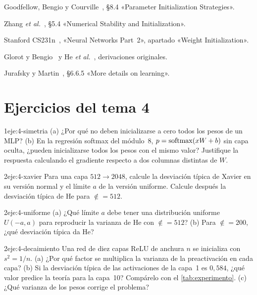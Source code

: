 \begin{lecturas}
\item Goodfellow, Bengio y Courville~\cite{gbc}, §8.4 «Parameter Initialization Strategies».
\item Zhang \emph{et al.}~\cite{d2l}, §5.4 «Numerical Stability and Initialization».
\item Stanford CS231n~\cite{cs231n}, «Neural Networks Part~2», apartado «Weight Initialization».
\item Glorot y Bengio~\cite{glorot} y He \emph{et al.}~\cite{he}, derivaciones originales.
\item Jurafsky y Martin~\cite{jm3}, §6.6.5 «More details on learning».
\end{lecturas}

\section*{Ejercicios del tema 4}

\begin{ejercicio}{1}{eje:4-simetria}
(a) ¿Por qué no deben inicializarse a cero todos los pesos de un MLP? (b) En la regresión softmax del módulo~8, $p=\operatorname{softmax}(xW+b)$ sin capa oculta, ¿pueden inicializarse todos los pesos con el mismo valor? Justifique la respuesta calculando el gradiente respecto a dos columnas distintas de $W$.
\end{ejercicio}

\begin{ejercicio}{2}{eje:4-xavier}
Para una capa $512\to 2048$, calcule la desviación típica de Xavier en su versión normal y el límite $a$ de la versión uniforme. Calcule después la desviación típica de He para $\nin=512$.
\end{ejercicio}

\begin{ejercicio}{2}{eje:4-uniforme}
(a) ¿Qué límite $a$ debe tener una distribución uniforme $U(-a,a)$ para reproducir la varianza de He con $\nin=512$? (b) Para $\nin=200$, ¿qué desviación típica da He?
\end{ejercicio}

\begin{ejercicio}{2}{eje:4-decaimiento}
Una red de diez capas ReLU de anchura $n$ se inicializa con $s^{2}=1/n$. (a) ¿Por qué factor se multiplica la varianza de la preactivación en cada capa? (b) Si la desviación típica de las activaciones de la capa~1 es $0{,}584$, ¿qué valor predice la teoría para la capa~10? Compárelo con el \cref{tab:experimento}. (c) ¿Qué varianza de los pesos corrige el problema?
\end{ejercicio}

